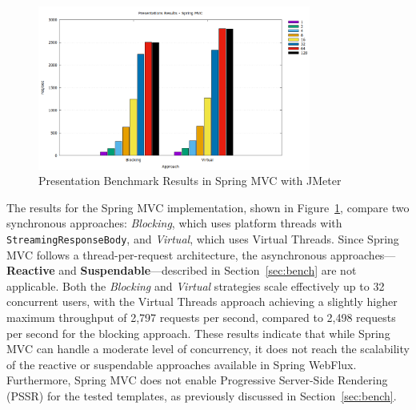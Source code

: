 \begin{figure}[h]
     \centering
     \includegraphics[width=0.8\textwidth]{./Graphs/presentations-springmvc-jmeter.png}
     \caption{Presentation Benchmark Results in Spring MVC with JMeter}\label{fig:presentations-springmvc-jmeter}
\end{figure}

The results for the Spring MVC implementation, shown in
Figure~\ref{fig:presentations-springmvc-jmeter}, compare two synchronous
approaches: \textit{Blocking}, which uses platform threads with
\texttt{StreamingResponseBody}, and \textit{Virtual}, which uses Virtual
Threads. Since Spring MVC follows a thread-per-request architecture, the
asynchronous approaches—\textbf{Reactive} and \textbf{Suspendable}—described in
Section~\ref{sec:bench} are not applicable. Both the \textit{Blocking} and
\textit{Virtual} strategies scale effectively up to 32 concurrent users, with
the Virtual Threads approach achieving a slightly higher maximum throughput of
2,797 requests per second, compared to 2,498 requests per second for the
blocking approach. These results indicate that while Spring MVC can handle a
moderate level of concurrency, it does not reach the scalability of the
reactive or suspendable approaches available in Spring WebFlux. Furthermore,
Spring MVC does not enable Progressive Server-Side Rendering (PSSR) for the
tested templates, as previously discussed in Section~\ref{sec:bench}.

